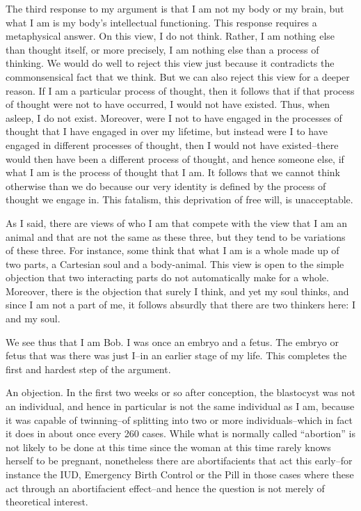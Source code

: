 The third response to my argument is that I am not my body or my 
brain, but what I am is my body’s intellectual functioning.  This response 
requires a metaphysical answer.  On this view, I do not think.  Rather, I 
am nothing else than thought itself, or more precisely, I am nothing else 
than a process of thinking.  We would do well to reject this view just 
because it contradicts the commonsensical fact that we think.  But we can 
also reject this view for a deeper reason.  If I am a particular process of 
thought, then it follows that if that process of thought were not to have 
occurred, I would not have existed.  Thus, when asleep, I do not exist.  
Moreover, were I not to have engaged in the processes of thought that I 
have engaged in over my lifetime, but instead were I to have engaged in 
different processes of thought, then I would not have existed–there would 
then have been a different process of thought, and hence someone else, if 
what I am is the process of thought that I am.  It follows that we cannot 
think otherwise than we do because our very identity is defined by the 
process of thought we engage in.  This fatalism, this deprivation of free 
will, is unacceptable. 

As I said, there are views of who I am that compete with the view 
that I am an animal and that are not the same as these three, but they tend 
to be variations of these three.  For instance, some think that what I am is 
a whole made up of two parts, a Cartesian soul and a body-animal.  This 
view  is  open  to  the  simple  objection  that  two  interacting  parts  do  not 
automatically make for a whole.  Moreover, there is the objection that 
surely I think, and yet my soul thinks, and since I am not a part of me, it 
follows absurdly that there are two thinkers here: I and my soul. 

We see thus that I am Bob.  I was once an embryo and a fetus.  The 
embryo or fetus that was there was just I–in an earlier stage of my life.  
This completes the first and hardest step of the argument. 

An  objection.    In  the  first  two  weeks  or  so  after  conception,  the 
blastocyst was not an individual, and hence in particular is not the same 
individual as I am, because it was capable of twinning–of splitting into 
two or more individuals–which in fact it does in about once every 260 
cases.  While what is normally called “abortion” is not likely to be done 
at  this  time  since  the  woman  at  this  time  rarely  knows  herself  to  be 
pregnant,  nonetheless  there  are  abortifacients  that  act  this  early–for 
instance  the  IUD,  Emergency  Birth  Control  or  the  Pill  in  those  cases 
where these act through an abortifacient effect–and hence the question is 
not merely of theoretical interest. 

